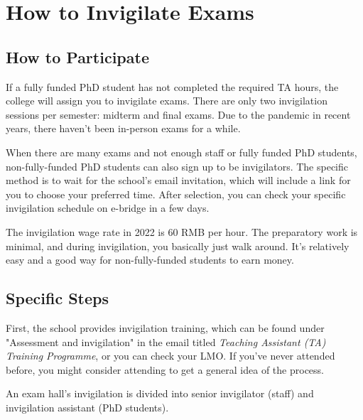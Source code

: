 \section{How to Invigilate Exams}

\subsection{How to Participate}
If a fully funded PhD student has not completed the required TA hours, the college will assign you to invigilate exams. There are only two invigilation sessions per semester: midterm and final exams. Due to the pandemic in recent years, there haven't been in-person exams for a while.

When there are many exams and not enough staff or fully funded PhD students, non-fully-funded PhD students can also sign up to be invigilators. The specific method is to wait for the school's email invitation, which will include a link for you to choose your preferred time. After selection, you can check your specific invigilation schedule on e-bridge in a few days.

The invigilation wage rate in 2022 is 60 RMB per hour. The preparatory work is minimal, and during invigilation, you basically just walk around. It's relatively easy and a good way for non-fully-funded students to earn money.

\subsection{Specific Steps}
First, the school provides invigilation training, which can be found under "Assessment and invigilation" in the email titled \textit{Teaching Assistant (TA) Training Programme}, or you can check your LMO. If you've never attended before, you might consider attending to get a general idea of the process.

An exam hall's invigilation is divided into senior invigilator (staff) and invigilation assistant (PhD students).

